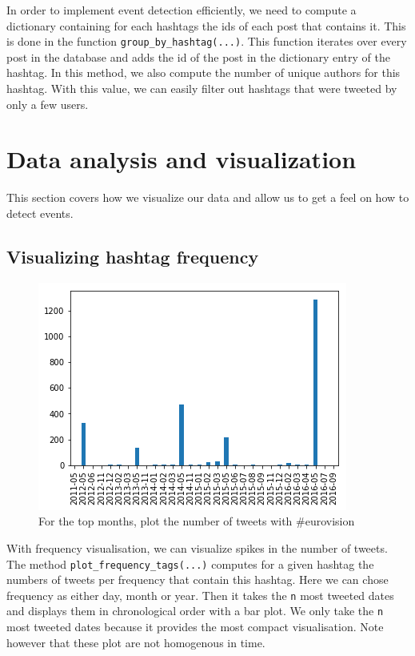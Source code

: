 \documentclass[11pt]{article}
\begin{document}
In order to implement event detection efficiently, we need to compute a dictionary containing for each hashtags the ids of each post that contains it. This is done in the function \texttt{group\_by\_hashtag(...)}. This function iterates over every post in the database and adds the id of the post in the dictionary entry of the hashtag. In this method, we also compute the number of unique authors for this hashtag. With this value, we can easily filter out hashtags that were tweeted by only a few users.


\section{Data analysis and visualization}

This section covers how we visualize our data and allow us to get a feel on how to detect events.

\subsection{Visualizing hashtag frequency}

\begin{figure}[htbp]
  \vspace*{-1mm}
  \centering
  \includegraphics[width=\columnwidth]{figures/freq_month_eurovision.png}
  \vspace{-5mm}
  \caption{For the top months, plot the number of tweets with  \#eurovision}
  \label{fig:freq_month_eurovision}
\end{figure}

With frequency visualisation, we can visualize spikes in the number of tweets. The method \texttt{plot\_frequency\_tags(...)} computes for a given hashtag the numbers of tweets per frequency that contain this hashtag. Here we can chose frequency as either day, month or year. Then it takes the \texttt{n} most tweeted dates and displays them in chronological order with a bar plot. We only take the \texttt{n} most tweeted dates because it provides the most compact visualisation. Note however that these plot are not homogenous in time. 
\end{document}
